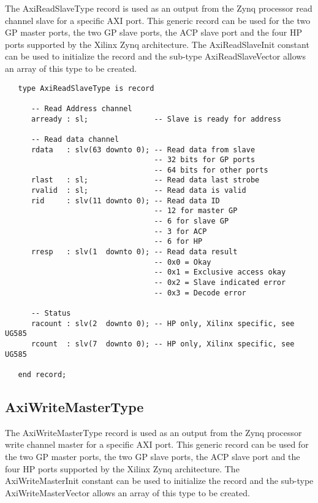 \documentclass[11pt]{article}
\begin{document}
The AxiReadSlaveType record is used as an output from the Zynq processor read channel slave for a specific AXI port. This generic record can be used for the two GP master ports, the two GP slave ports, the ACP slave port and the four HP ports supported by the Xilinx Zynq architecture. 
The AxiReadSlaveInit constant can be used to initialize the record and the sub-type AxiReadSlaveVector allows an array of this type to be created.

\small
\begin{verbatim}
   type AxiReadSlaveType is record

      -- Read Address channel
      arready : sl;               -- Slave is ready for address

      -- Read data channel
      rdata   : slv(63 downto 0); -- Read data from slave
                                  -- 32 bits for GP ports
                                  -- 64 bits for other ports
      rlast   : sl;               -- Read data last strobe
      rvalid  : sl;               -- Read data is valid
      rid     : slv(11 downto 0); -- Read data ID
                                  -- 12 for master GP 
                                  -- 6 for slave GP 
                                  -- 3 for ACP 
                                  -- 6 for HP
      rresp   : slv(1  downto 0); -- Read data result
                                  -- 0x0 = Okay
                                  -- 0x1 = Exclusive access okay
                                  -- 0x2 = Slave indicated error 
                                  -- 0x3 = Decode error

      -- Status
      racount : slv(2  downto 0); -- HP only, Xilinx specific, see UG585
      rcount  : slv(7  downto 0); -- HP only, Xilinx specific, see UG585

   end record;
\end{verbatim}
\normalsize

\subsection{AxiWriteMasterType}
\label{subsec:AxiWriteMasterType}

The AxiWriteMasterType record is used as an output from the Zynq processor write channel master for a specific AXI port. This generic record can be used for the two GP master ports, the two GP slave ports, the ACP slave port and the four HP ports supported by the Xilinx Zynq architecture. 
The AxiWriteMasterInit constant can be used to initialize the record and the sub-type AxiWriteMasterVector allows an array of this type to be created.
\end{document}
